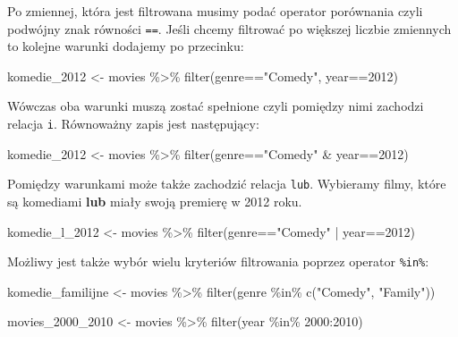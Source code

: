 \documentclass[
]{book}
\newenvironment{Shaded}{\begin{snugshade}}{\end{snugshade}}
\newcommand{\DecValTok}[1]{\textcolor[rgb]{0.00,0.00,0.81}{#1}}
\newcommand{\FunctionTok}[1]{\textcolor[rgb]{0.00,0.00,0.00}{#1}}
\newcommand{\NormalTok}[1]{#1}
\newcommand{\OtherTok}[1]{\textcolor[rgb]{0.56,0.35,0.01}{#1}}
\newcommand{\SpecialCharTok}[1]{\textcolor[rgb]{0.00,0.00,0.00}{#1}}
\newcommand{\StringTok}[1]{\textcolor[rgb]{0.31,0.60,0.02}{#1}}
\begin{document}
Po zmiennej, która jest filtrowana musimy podać operator porównania czyli podwójny znak równości \texttt{==}. Jeśli chcemy filtrować po większej liczbie zmiennych to kolejne warunki dodajemy po przecinku:

\begin{Shaded}
\begin{Highlighting}[]
\NormalTok{komedie\_2012 }\OtherTok{\textless{}{-}}\NormalTok{ movies }\SpecialCharTok{\%\textgreater{}\%}
  \FunctionTok{filter}\NormalTok{(genre}\SpecialCharTok{==}\StringTok{"Comedy"}\NormalTok{, year}\SpecialCharTok{==}\DecValTok{2012}\NormalTok{)}
\end{Highlighting}
\end{Shaded}

Wówczas oba warunki muszą zostać spełnione czyli pomiędzy nimi zachodzi relacja \texttt{i}. Równoważny zapis jest następujący:

\begin{Shaded}
\begin{Highlighting}[]
\NormalTok{komedie\_2012 }\OtherTok{\textless{}{-}}\NormalTok{ movies }\SpecialCharTok{\%\textgreater{}\%}
  \FunctionTok{filter}\NormalTok{(genre}\SpecialCharTok{==}\StringTok{"Comedy"} \SpecialCharTok{\&}\NormalTok{ year}\SpecialCharTok{==}\DecValTok{2012}\NormalTok{)}
\end{Highlighting}
\end{Shaded}

Pomiędzy warunkami może także zachodzić relacja \texttt{lub}. Wybieramy filmy, które są komediami \textbf{lub} miały swoją premierę w 2012 roku.

\begin{Shaded}
\begin{Highlighting}[]
\NormalTok{komedie\_l\_2012 }\OtherTok{\textless{}{-}}\NormalTok{ movies }\SpecialCharTok{\%\textgreater{}\%}
  \FunctionTok{filter}\NormalTok{(genre}\SpecialCharTok{==}\StringTok{"Comedy"} \SpecialCharTok{|}\NormalTok{ year}\SpecialCharTok{==}\DecValTok{2012}\NormalTok{)}
\end{Highlighting}
\end{Shaded}

Możliwy jest także wybór wielu kryteriów filtrowania poprzez operator \texttt{\%in\%}:

\begin{Shaded}
\begin{Highlighting}[]
\NormalTok{komedie\_familijne }\OtherTok{\textless{}{-}}\NormalTok{ movies }\SpecialCharTok{\%\textgreater{}\%}
  \FunctionTok{filter}\NormalTok{(genre }\SpecialCharTok{\%in\%} \FunctionTok{c}\NormalTok{(}\StringTok{"Comedy"}\NormalTok{, }\StringTok{"Family"}\NormalTok{))}

\NormalTok{movies\_2000\_2010 }\OtherTok{\textless{}{-}}\NormalTok{ movies }\SpecialCharTok{\%\textgreater{}\%}
  \FunctionTok{filter}\NormalTok{(year }\SpecialCharTok{\%in\%} \DecValTok{2000}\SpecialCharTok{:}\DecValTok{2010}\NormalTok{)}
\end{Highlighting}
\end{Shaded}
\end{document}
